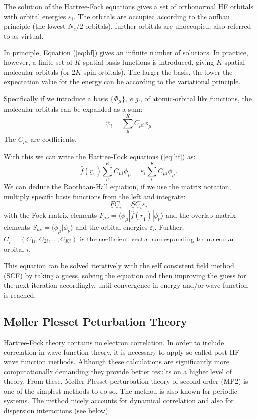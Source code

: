 \documentclass[11pt,DIV=13,BCOR=5mm,a4paper,headinclude]{scrbook}
\renewcommand{\vec}[1]{\underline{#1}}
\def\doubleunderline#1{\underline{\underline{#1}}}
\begin{document}
The solution of the Hartree-Fock equations gives a set of orthonormal HF orbitals with orbital energies $\varepsilon_i$.
The orbitals are occupied according to the aufbau principle (the lowest $N_e/2$ orbitals), further orbitals are unoccupied, also referred to as virtual. 

In principle, Equation (\ref{eq:hf}) gives an infinite number of solutions.
In practice, however, a finite set of $K$ spatial basis functions is introduced, giving $K$ spatial molecular orbitals (or $2K$ spin orbitals).
The larger the basis, the lower the expectation value for the energy can be according to the variational principle.

Specifically if we introduce a basis $\{\Phi_\mu\}$, \textit{e.g.}, of atomic-orbital like functions, the molecular orbitals can be expanded as a sum:
\begin{equation}\label{eq:basis}
\psi_i=\sum_\mu^KC_{\mu i}\phi_\mu
\end{equation}
The $C_{\mu i}$ are coefficients.

With this we can write the Hartree-Fock equations (\ref{eq:hf}) as:
\begin{equation}
 \hat{f}(\vec{r}_1) \sum_\mu^KC_{\mu i}\phi_\mu = \varepsilon_i \sum_\mu^KC_{\mu i}\phi_\mu.
\end{equation}
We can deduce the Roothaan-Hall equation, if we use the matrix notation, multiply specific basis functions from the left and integrate:
\begin{equation}\label{eq:RH}
 \doubleunderline{F} \vec{C}_i=\doubleunderline{S} \vec{C}_i\varepsilon_i
\end{equation}
with the Fock matrix elements $F_{\mu\nu}=\langle \phi_\mu|\hat{f}(\vec{r}_1)|\phi_\nu\rangle$ and the overlap matrix elements $S_{\mu\nu}=\langle \phi_\mu|\phi_\nu\rangle$ and the orbital energies $\varepsilon_i$.
Further, $\vec{C}_i=(C_{1i}, C_{2i},...,C_{Ki})$ is the coefficient vector corresponding to molecular orbital $i$.

This equation can be solved iteratively with the self consistent field method (SCF) by taking a guess, solving the equation and then improving the guess for the next iteration accordingly, until convergence in energy and/or wave function is reached.


\subsection{M\o{}ller Plesset Peturbation Theory}
Hartree-Fock theory contains no electron correlation.
In order to include correlation in wave function theory, it is necessary to apply so called post-HF wave function methods.
Although these calculations are significantly more computationally demanding they provide better results on a higher level of theory.
From these, M\o{}ller Plesset perturbation theory of second order (MP2)\cite{mollerplesset} is one of the simplest methods to do so.
The method is also known for periodic systems\cite{Suhai1984}.
The method nicely accounts for dynamical correlation and also for dispersion interactions (see below).
\end{document}
